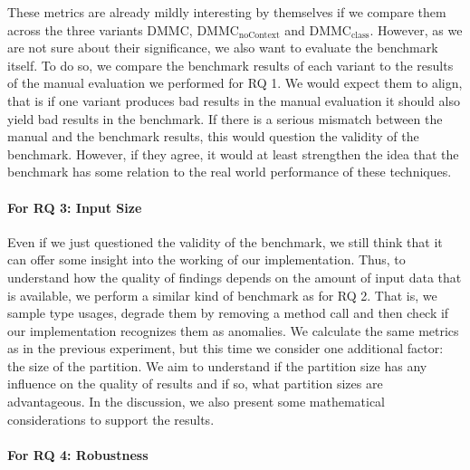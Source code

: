 

These metrics are already mildly interesting by themselves if we compare them across the three variants $\text{DMMC}$, $\text{DMMC}_\text{noContext}$ and $\text{DMMC}_\text{class}$.
However, as we are not sure about their significance, we also want to evaluate the benchmark itself.
To do so, we compare the benchmark results of each variant to the results of the manual evaluation we performed for RQ 1.
We would expect them to align, that is if one variant produces bad results in the manual evaluation it should also yield bad results in the benchmark.
If there is a serious mismatch between the manual and the benchmark results, this would question the validity of the benchmark.
However, if they agree, it would at least strengthen the idea that the benchmark has some relation to the real world performance of these techniques.

\paragraph{For RQ 3: Input Size}

Even if we just questioned the validity of the benchmark, we still think that it can offer some insight into the working of our implementation.
Thus, to understand how the quality of findings depends on the amount of input data that is available, we perform a similar kind of benchmark as for RQ 2.
That is, we sample type usages, degrade them by removing a method call and then check if our implementation recognizes them as anomalies.
We calculate the same metrics as in the previous experiment, but this time we consider one additional factor: the size of the partition.
We aim to understand if the partition size has any influence on the quality of results and if so, what partition sizes are advantageous.
In the discussion, we also present some mathematical considerations to support the results.
    
\paragraph{For RQ 4: Robustness}

